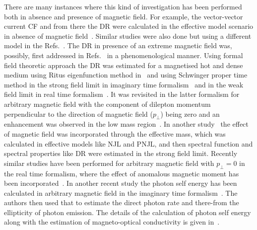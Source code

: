 \documentclass[aps,prd,floatfix,showpacs,showkeys,superscriptadress,unsortedaddress,nofootinbib,onecolumn]{revtex4-1}
\newcommand{\sperp}{\scriptscriptstyle{\perp}}
\begin{document}
There are many instances where this kind of investigation has been performed both in absence and presence of magnetic field. For example, the vector-vector current CF and from there the DR were calculated in the effective model scenario in absence of magnetic field~\cite{Islam:2014sea}. Similar studies were also done but using a different model in the Refs.~\cite{Gale:2014dfa,Hidaka:2015ima}. The DR in presence of an extreme magnetic field was, possibly, first addressed in Refs.~\cite{Tuchin:2012mf,Tuchin:2013bda,Tuchin:2013ie} in a phenomenological manner. Using formal field theoretic approach the DR was estimated for a magnetised hot and dense medium using Ritus eigenfunction method in~\cite{Sadooghi:2016jyf,Hattori:2020htm} and using Schwinger proper time method in the strong field limit in imaginary time formalism~\cite{Bandyopadhyay:2016fyd} and in the weak field limit in real time formalism~\cite{Bandyopadhyay:2017raf}. It was revisited in the latter formalism for arbitrary magnetic field with the component of dilepton momentum perpendicular to the direction of magnetic field ($p_{\sperp}$) being zero and an enhancement was observed in the low mass region~\cite{Ghosh:2018xhh}. In another study~\cite{Islam:2018sog} the effect of magnetic field was incorporated through the effective mass, which was calculated in effective models like NJL and PNJL, and then spectral function and spectral properties like DR were estimated in the strong field limit. Recently similar studies have been performed for arbitrary magnetic field with $p_{\sperp}=0$ in the real time formalism, where the effect of anomalous magnetic moment has been incorporated~\cite{Ghosh:2020xwp}. In another recent study the photon self energy has been calculated in arbitrary magnetic field in the imaginary time formalism~\cite{Wang:2020dsr}. The authors then used that to estimate the direct photon rate and there-from the ellipticity of photon emission. The details of the calculation of photon self energy along with the estimation of magneto-optical conductivity is given in~\cite{Wang:2021ebh}.
\end{document}
